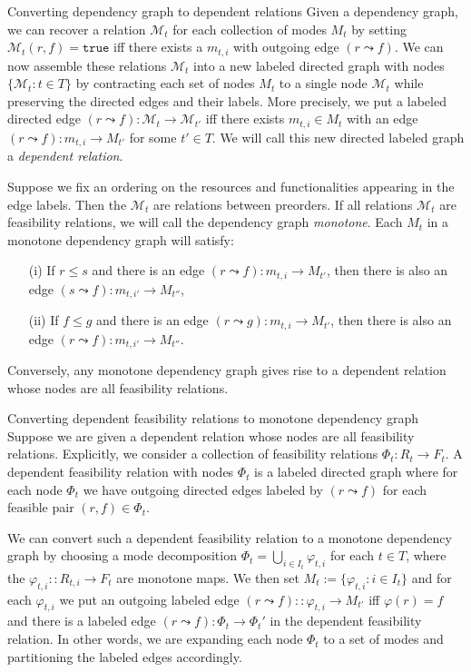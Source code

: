 \documentclass[12pt, a4paper]{article}
\theoremstyle{definition}
\theoremstyle{plain}
\theoremstyle{plain}
\theoremstyle{plain}
\theoremstyle{plain}
\theoremstyle{plain}
\theoremstyle{remark}
\theoremstyle{remark}
\newcommand{\mc}[1]{\mathcal{#1}}
\begin{document}
\begin{tcexample}{Converting dependency graph to dependent relations}{}
	Given a dependency graph, we can recover a relation $\mc{M}_t$ for each collection of modes $M_t$ by setting $\mc{M}_t(r,f) = \mathtt{true}$ iff there exists a $m_{t,i}$ with outgoing edge $(r \leadsto f)$. We can now assemble these relations $\mc{M}_t$ into a new labeled directed graph with nodes $\{\mc{M}_t : t \in T\}$ by contracting each set of nodes $M_t$ to a single node $\mc{M}_t$ while preserving the directed edges and their labels. More precisely, we put a
	labeled directed edge $(r \leadsto f) \colon \mc{M}_t \rightarrow \mc{M}_{t'}$ iff there exists $m_{t,i} \in M_t$ with an edge $(r \leadsto f) \colon m_{t,i} \rightarrow M_{t'}$ for some $t' \in T$. We will call this new directed labeled graph a \emph{dependent relation}.
	
	Suppose we fix an ordering on the resources and functionalities appearing in the edge labels. Then the $\mc{M}_t$ are relations between preorders. If all relations $\mc{M}_t$ are feasibility relations, we will call the dependency graph \emph{monotone}. Each $M_t$ in a monotone dependency graph will satisfy:
	\begin{itemize}
		\item[(i)] If $r \leq s$ and there is an edge $(r \leadsto f) \colon m_{t,i} \rightarrow M_{t'}$, then there is also an edge $(s \leadsto f) \colon m_{t,i'} \rightarrow M_{t''}$, 
		\item[(ii)] If $f \leq g$ and there is an edge $(r \leadsto g) \colon m_{t,i} \rightarrow M_{t'}$, then there is also an edge $(r \leadsto f) \colon m_{t,i'} \rightarrow M_{t''}$.
	\end{itemize}
	Conversely, any monotone dependency graph gives rise to a dependent relation whose nodes are all feasibility relations.
\end{tcexample}

\begin{tcexample}{Converting dependent feasibility relations to monotone dependency graph}{}
	Suppose we are given a dependent relation whose nodes are all feasibility relations. Explicitly, we consider a collection of feasibility relations $\Phi_t \colon R_t \rightarrow F_t$. A dependent feasibility relation with nodes $\Phi_t$ is a labeled directed graph where for each node $\Phi_t$ we have outgoing directed edges labeled by $(r \leadsto f)$ for each feasible pair $(r,f) \in \Phi_t$.

	We can convert such a dependent feasibility relation to a monotone dependency graph by choosing a mode decomposition $\Phi_t = \bigcup_{i \in I_t} \varphi_{t,i}$ for each $t \in T$, where the $\varphi_{t,i} \colon: R_{t,i} \rightarrow F_t$ are monotone maps. We then set $M_t := \{ \varphi_{t,i} : i \in I_t \}$ and for each $\varphi_{t,i}$ we put an outgoing labeled edge $(r \leadsto f) \colon : \varphi_{t,i} \rightarrow M_{t'}$ iff $\varphi(r) = f$ and there is a labeled edge $(r \leadsto f) \colon \Phi_t \rightarrow \Phi_t'$ in the dependent feasibility relation. In other words, we are expanding each node $\Phi_t$ to a set of modes and partitioning the labeled edges accordingly.
\end{tcexample}
\end{document}
